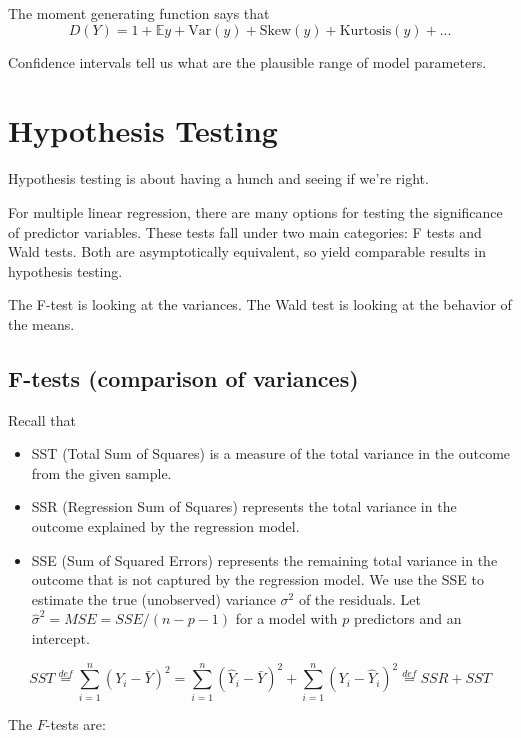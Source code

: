 \documentclass[
  letterpaper,
  DIV=11,
  numbers=noendperiod]{scrreport}
\providecommand{\tightlist}{%
  \setlength{\itemsep}{0pt}\setlength{\parskip}{0pt}}\usepackage{longtable,booktabs,array}
\begin{document}
The moment generating function says that
\[D(Y) = 1 + \mathbb Ey + \text{Var}(y) + \text{Skew}(y) + \text{Kurtosis}(y) + ...\]

Confidence intervals tell us what are the plausible range of model
parameters.

\hypertarget{hypothesis-testing}{%
\section{Hypothesis Testing}\label{hypothesis-testing}}

Hypothesis testing is about having a hunch and seeing if we're right.

For multiple linear regression, there are many options for testing the
significance of predictor variables. These tests fall under two main
categories: F tests and Wald tests. Both are asymptotically equivalent,
so yield comparable results in hypothesis testing.

The F-test is looking at the variances. The Wald test is looking at the
behavior of the means.

\hypertarget{f-tests-comparison-of-variances}{%
\subsection{F-tests (comparison of
variances)}\label{f-tests-comparison-of-variances}}

Recall that

\begin{itemize}
\tightlist
\item
  SST (Total Sum of Squares) is a measure of the total variance in the
  outcome from the given sample.
\item
  SSR (Regression Sum of Squares) represents the total variance in the
  outcome explained by the regression model.
\item
  SSE (Sum of Squared Errors) represents the remaining total variance in
  the outcome that is not captured by the regression model. We use the
  SSE to estimate the true (unobserved) variance \(\sigma^2\) of the
  residuals. Let \(\hat \sigma^2 = MSE = SSE/(n-p-1)\) for a model with
  \(p\) predictors and an intercept.
\end{itemize}

\[SST \stackrel{def}{=} \sum_{i=1}^n (Y_i - \bar Y)^2 = \sum_{i=1}^n (\hat Y_i - \bar Y)^2 + \sum_{i=1}^n (Y_i - \hat Y_i)^2 \stackrel{def}{=} SSR + SST\]

The \(F\)-tests are:
\end{document}
